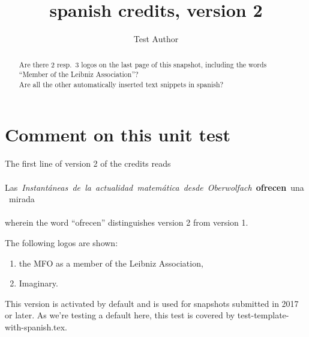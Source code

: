 \documentclass{snapshotmfo}
\author{Test Author}
\title{spanish credits, version 2}
\begin{document}
\begin{abstract}
Are there 2 resp.\ 3 logos on the last page of this snapshot, including the words ``Member of the Leibniz Association''?\\
Are all the other automatically inserted text snippets in spanish?
\end{abstract}

\section{Comment on this unit test}
The first line of version 2 of the credits reads\\
\\
\hbox{Las \emph{Instantáneas de la actualidad matemática desde Oberwolfach} \textbf{ofrecen} una mirada}\\
\\
wherein the word ``ofrecen'' distinguishes version 2 from version 1.

The following logos are shown:
\begin{enumerate}
  \item the MFO as a member of the Leibniz Association,
  \item Imaginary.
\end{enumerate}
This version is activated by default
and is used for snapshots submitted in 2017 or later.
As we're testing a default here, this test is covered by test-template-with-spanish.tex.
\end{document}
